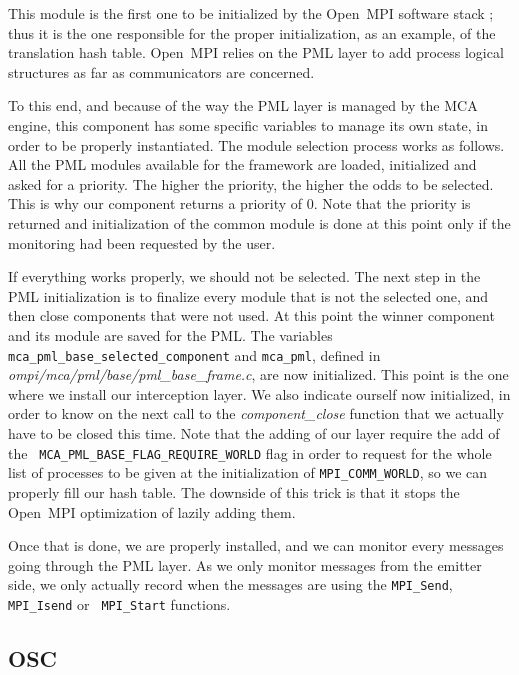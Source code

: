 \documentclass[notitlepage]{article}
\newcommand{\ompi}[0]{Open~MPI}
\newcommand{\brkunds}[0]{\allowbreak\_}
\begin{document}
This module is the first one to be initialized by the \ompi{} software
stack ; thus it is the one responsible for the proper initialization,
as an example, of the translation hash table. \ompi{} relies on the
PML layer to add process logical structures as far as communicators
are concerned.

To this end, and because of the way the PML layer is managed by the
MCA engine, this component has some specific variables to manage its
own state, in order to be properly instantiated. The module selection
process works as follows. All the PML modules available for the
framework are loaded, initialized and asked for a priority. The higher
the priority, the higher the odds to be selected. This is why our
component returns a priority of 0. Note that the priority is returned
and initialization of the common module is done at this point only if
the monitoring had been requested by the user.

If everything works properly, we should not be selected. The next step
in the PML initialization is to finalize every module that is not the
selected one, and then close components that were not used. At this
point the winner component and its module are saved for the PML. The
variables {\tt
  mca\brkunds{}pml\brkunds{}base\brkunds{}selected\brkunds{}component}
and {\tt mca\brkunds{}pml}, defined in {\it
  ompi/mca/pml/base/pml\brkunds{}base\brkunds{}frame.c}, are now
initialized. This point is the one where we install our interception
layer. We also indicate ourself now initialized, in order to know on
the next call to the {\it component\brkunds{}close} function that we
actually have to be closed this time. Note that the adding of our
layer require the add of the {\tt
  MCA\brkunds{}PML\brkunds{}BASE\brkunds{}FLAG\brkunds{}REQUIRE\brkunds{}WORLD}
flag in order to request for the whole list of processes to be given
at the initialization of {\tt MPI\brkunds{}COMM\brkunds{}WORLD}, so we
can properly fill our hash table. The downside of this trick is that
it stops the \ompi{} optimization of lazily adding them.

Once that is done, we are properly installed, and we can monitor every
messages going through the PML layer. As we only monitor messages from
the emitter side, we only actually record when the messages are using
the {\tt MPI\brkunds{}Send}, {\tt MPI\brkunds{}Isend} or {\tt
  MPI\brkunds{}Start} functions.

\subsection{OSC}
\label{subsec:TDI-osc}
\end{document}
